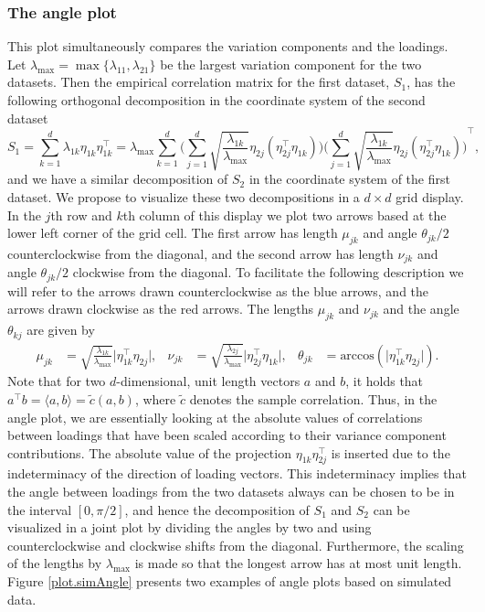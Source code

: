 \documentclass[a4paper,14pt]{article}
\newcommand{\acos}{\text{arccos}}
\begin{document}
\subsubsection*{The angle plot}
This plot simultaneously compares the variation components and the loadings. Let $\lambda_{\max} = \max\{ \lambda_{11}, \lambda_{21} \}$ be the largest variation component for the two datasets. Then the empirical correlation matrix for the first dataset, $S_1$, has the following orthogonal decomposition in the coordinate system of the second dataset
\begin{equation*}
S_1 = \sum_{k=1}^d \lambda_{1k} \eta_{1k} \eta_{1k}^\top
= \lambda_{\max} \sum_{k=1}^d
\Bigg( \sum_{j=1}^d \sqrt{\frac{\lambda_{1k}}{\lambda_{\max}}} \eta_{2j} (\eta_{2j}^\top \eta_{1k}) \Bigg)
{\Bigg( \sum_{j=1}^d \sqrt{\frac{\lambda_{1k}}{\lambda_{\max}}} \eta_{2j} (\eta_{2j}^\top \eta_{1k}) \Bigg)}^\top,
\end{equation*}
and we have a similar decomposition of $S_2$ in the coordinate system of the first dataset. We propose to visualize these two decompositions in a $d \times d$ grid display. In the $j$th row and $k$th column of this display we plot two arrows based at the lower left corner of the grid cell. The first arrow has length $\mu_{jk}$ and angle $\theta_{jk}/2$ counterclockwise from the diagonal, and the second arrow has length $\nu_{jk}$ and angle $\theta_{jk}/2$ clockwise from the diagonal. To facilitate the following description we will refer to the arrows drawn counterclockwise as the blue arrows, and the arrows drawn clockwise as the red arrows. The lengths $\mu_{jk}$ and $\nu_{jk}$ and the angle $\theta_{kj}$ are given by
\begin{align*}
\mu_{jk} &= \sqrt{\frac{\lambda_{1k}}{\lambda_{\max}}} \lvert \eta_{1k}^\top \eta_{2j} \rvert, &
\nu_{jk} &= \sqrt{\frac{\lambda_{2j}}{\lambda_{\max}}} \lvert \eta_{2j}^\top \eta_{1k} \rvert, &
\theta_{jk} &= \acos(\lvert \eta_{1k}^\top \eta_{2j} \rvert).
\end{align*}
Note that for two $d$-dimensional, unit length vectors $a$ and $b$, it holds that $ a^\top b = \langle a, b \rangle = \tilde{c}(a,b)$, where $\tilde{c}$ denotes the sample correlation. Thus, in the angle plot, we are essentially looking at the absolute values of correlations between loadings that have been scaled according to their variance component contributions. The absolute value of the projection $\eta_{1k} \eta_{2j}^\top$ is inserted due to the indeterminacy of the direction of loading vectors. This indeterminacy implies that the angle between loadings from the two datasets always can be chosen to be in the interval $[0,\pi/2]$, and hence the decomposition of $S_1$ and $S_2$ can be visualized in a joint plot by dividing the angles by two and using counterclockwise and clockwise shifts from the diagonal. Furthermore, the scaling of the lengths by $\lambda_{\max}$ is made so that the longest arrow has at most unit length. Figure \ref{plot.simAngle} presents two examples of angle plots based on simulated data.
\end{document}
